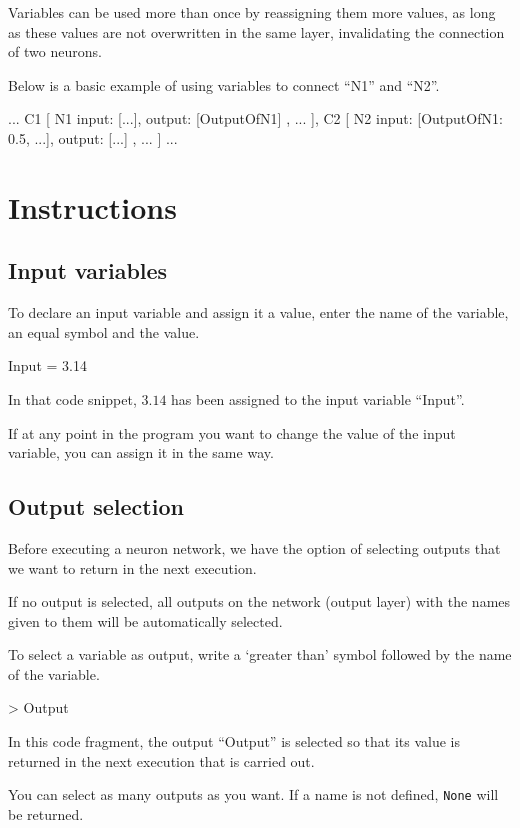 \documentclass[a4paper]{article}
\begin{document}
Variables can be used more than once by reassigning them more values, as long as these values   are not overwritten in the same layer, invalidating the connection of two neurons.

Below is a basic example of using variables to connect ``N1'' and ``N2''.
\begin{codebox}
...
C1 [
	N1{ input: [...], output: [OutputOfN1] },
	...
],
C2 [
	N2{ input: [OutputOfN1: 0.5, ...], output: [...] },
	...
]
...
\end{codebox}

\section{Instructions}
\subsection{Input variables} \label{entradas}
To declare an input variable and assign it a value, enter the name of the variable, an equal symbol and the value.

\begin{codebox}
Input = 3.14
\end{codebox}

In that code snippet, $3.14$ has been assigned to the input variable ``Input''.

If at any point in the program you want to change the value of the input variable, you can assign it in the same way.

\subsection{Output selection}

Before executing a neuron network, we have the option of selecting outputs that we want to return in the next execution.

If no output is selected, all outputs on the network (output layer) with the names given to them will be automatically selected.

To select a variable as output, write a `greater than' symbol followed by the name of the variable.

\begin{codebox}
> Output
\end{codebox}

In this code fragment, the output ``Output'' is selected so that its value is returned in the next execution that is carried out.

You can select as many outputs as you want. If a name is not defined, \texttt{None} will be returned.
\end{document}
